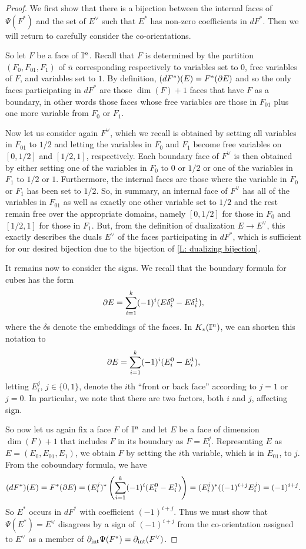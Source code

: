 \begin{proof}
	We first show that there is a bijection between the internal faces of $\Psi(F^*)$ and the set of $E^\vee$ such that $E^*$ has non-zero coefficients in $dF^*$.
	Then we will return to carefully consider the co-orientations.

	So let $F$ be a face of $\mathbb{I}^n$.
	Recall that $F$ is determined by the partition $(F_0,F_{01}, F_1)$ of $\overline{n}$ corresponding respectively to variables set to $0$, free variables of $F$, and variables set to $1$.
	By definition, $(dF^*)(E) = F^*(\partial E)$ and so the only faces participating in $dF^*$ are those $\dim(F)+1$ faces that have $F$ as a boundary, in other words those faces whose free variables are those in $F_{01}$ plus one more variable from $F_0$ or $F_1$.

	Now let us consider again $F^\vee$, which we recall is obtained by setting all variables in $F_{01}$ to $1/2$ and letting the variables in $F_0$ and $F_1$ become free variables on $[0,1/2]$ and $[1/2,1]$, respectively.
	Each boundary face of $F^\vee$ is then obtained by either setting one of the variables in $F_0$ to $0$ or $1/2$ or one of the variables in $F_1$ to $1/2$ or $1$.
	Furthermore, the internal faces are those where the variable in $F_0$ or $F_1$ has been set to $1/2$.
	So, in summary, an internal face of $F^\vee$ has all of the variables in $F_{01}$ as well as exactly one other variable set to $1/2$ and the rest remain free over the appropriate domains, namely $[0,1/2]$ for those in $F_0$ and $[1/2,1]$ for those in $F_1$.
	But, from the definition of dualization $E \to E^\vee$, this exactly describes the duals $E^\vee$ of the faces participating in $dF^*$, which is sufficient for our desired bijection due to the bijection of \cref{L: dualizing bijection}.

	It remains now to consider the signs.
	We recall that the boundary formula for cubes has the form
	$$\partial E = \sum_{i = 1}^k (-1)^i(E \delta_i^0-E \delta^1_i),$$ where the $\delta$s denote the embeddings of the faces.
	In $K_*(\mathbb{I}^n)$, we can shorten this notation to $$\partial E = \sum_{i = 1}^k (-1)^i(E_i^0-E^1_i),$$ letting $E_i^j$, $j \in \{0,1\}$, denote the $i$th ``front or back face'' according to $j = 1$ or $j = 0$.
	In particular, we note that there are two factors, both $i$ and $j$, affecting sign.

	So now let us again fix a face $F$ of $\mathbb{I}^n$ and let $E$ be a face of dimension $\dim(F)+1$ that includes $F$ in its boundary as $F = E_i^j$.
	Representing $E$ as $E = (E_0,E_{01},E_1)$, we obtain $F$ by setting the $i$th variable, which is in $E_{01}$, to $j$.
	From the coboundary formula, we have
	\begin{equation*}
		(dF^*)(E) = F^*(\partial E) = (E_i^j)^*\left(\sum_{i = 1}^k (-1)^i(E_i^0-E^1_i)\right)
		= (E_i^j)^*((-1)^{i+j}E_i^j) = (-1)^{i+j}.
	\end{equation*}
	So 	$E^*$ occurs in $dF^*$ with coefficient $(-1)^{i+j}$.
	Thus we must show that $\Psi(E^*) = E^\vee$ disagrees by a sign of $(-1)^{i+j}$ from the co-orientation assigned to $E^\vee$ as a member of $\partial_{\text{int}} \Psi(F^*) = \partial_{\text{int}} (F^\vee)$.


\end{proof}
